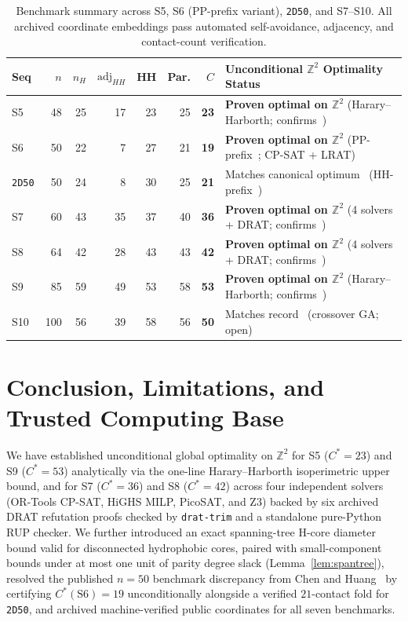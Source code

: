 \documentclass[11pt]{article}
\newcommand{\Z}{\mathbb{Z}}
\begin{document}
\begin{table}[tb]
\centering
\caption{Benchmark summary across S5, S6 (PP-prefix variant), \texttt{2D50}, and S7--S10. All archived coordinate embeddings pass automated self-avoidance, adjacency, and contact-count verification.}
\label{tab:summary}
\footnotesize
\begin{tabular}{@{}lrrrrrrl@{}}
\toprule
\textbf{Seq} & $n$ & $n_H$ & $\mathrm{adj}_{HH}$ & \textbf{HH} & \textbf{Par.} & \textbf{$C$} & \textbf{Unconditional $\Z^2$ Optimality Status} \\
\midrule
S5 & 48 & 25 & 17 & 23 & 25 & \textbf{23} & \textbf{Proven optimal on $\Z^2$} (Harary--Harborth; confirms~\cite{giaquinta2013}) \\
S6 & 50 & 22 & 7 & 27 & 21 & \textbf{19} & \textbf{Proven optimal on $\Z^2$} (PP-prefix~\cite{chen2005}; CP-SAT + LRAT) \\
\texttt{2D50} & 50 & 24 & 8 & 30 & 25 & \textbf{21} & Matches canonical optimum~\cite{giaquinta2013} (HH-prefix~\cite{unger1993}) \\
S7 & 60 & 43 & 35 & 37 & 40 & \textbf{36} & \textbf{Proven optimal on $\Z^2$} (4 solvers + DRAT; confirms~\cite{giaquinta2013}) \\
S8 & 64 & 42 & 28 & 43 & 43 & \textbf{42} & \textbf{Proven optimal on $\Z^2$} (4 solvers + DRAT; confirms~\cite{giaquinta2013}) \\
S9 & 85 & 59 & 49 & 53 & 58 & \textbf{53} & \textbf{Proven optimal on $\Z^2$} (Harary--Harborth; confirms~\cite{giaquinta2013}) \\
S10 & 100 & 56 & 39 & 58 & 56 & \textbf{50} & Matches record~\cite{hsu2003,wust2012,zhang2007} (crossover GA; open) \\
\bottomrule
\end{tabular}
\end{table}

\section{Conclusion, Limitations, and Trusted Computing Base}\label{sec:conclusion}

We have established unconditional global optimality on $\Z^2$ for S5 ($C^* = 23$) and S9 ($C^* = 53$) analytically via the one-line Harary--Harborth isoperimetric upper bound, and for S7 ($C^* = 36$) and S8 ($C^* = 42$) across four independent solvers (OR-Tools CP-SAT, HiGHS MILP, PicoSAT, and Z3) backed by six archived DRAT refutation proofs checked by \texttt{drat-trim} and a standalone pure-Python RUP checker. We further introduced an exact spanning-tree H-core diameter bound valid for disconnected hydrophobic cores, paired with small-component bounds under at most one unit of parity degree slack (Lemma~\ref{lem:spantree}), resolved the published $n = 50$ benchmark discrepancy from Chen and Huang~\cite[Table~1]{chen2005} by certifying $C^*(\mathrm{S6}) = 19$ unconditionally alongside a verified $21$-contact fold for \texttt{2D50}, and archived machine-verified public coordinates for all seven benchmarks.
\end{document}
